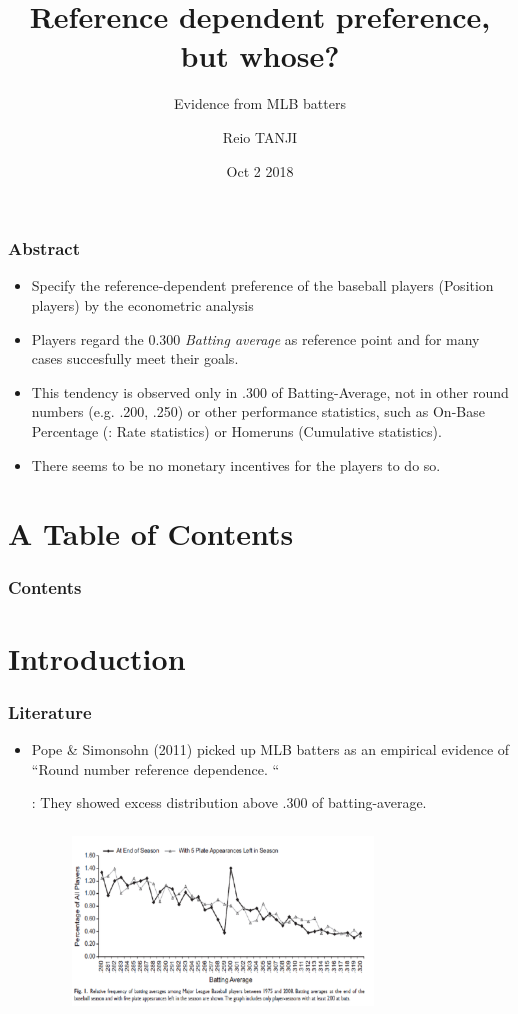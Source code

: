 \documentclass[dvipdfmx,12pt]{beamer}
\title{Reference dependent preference, but whose?}
\subtitle{Evidence from MLB batters}
\author{Reio TANJI}
\date{Oct 2 2018}
\institute{Osaka University}
\begin{document}
\begin{frame}\frametitle{}
\titlepage
\end{frame}

\begin{frame}\frametitle{Abstract}
  \begin{itemize}
    \item Specify the reference-dependent preference of the baseball
    players (Position players) by the econometric analysis

    \item Players regard the 0.300 \textit{Batting average}
    as reference point and for many cases succesfully meet their goals.

    \item This tendency is observed only in .300 of Batting-Average,
    not in other round numbers (e.g. .200, .250) or other
    performance statistics, such as On-Base Percentage (: Rate statistics)
     or Homeruns (Cumulative statistics).

    \item There seems to be no monetary incentives for the players to do so.
  \end{itemize}
\end{frame}

\section*{A Table of Contents}
\begin{frame}\frametitle{Contents}
 \tableofcontents
\end{frame}

\section{Introduction}
\begin{frame}\frametitle{Literature}
  \begin{itemize}
    \item Pope \& Simonsohn (2011) picked up MLB batters as an empirical evidence
    of ``Round number reference dependence. ``

    : They showed excess distribution above .300 of batting-average.

     \begin{figure}
       \includegraphics[width = 8cm, height = 5cm]{fig_tab/mt_fig1.pdf}
     \end{figure}
  \end{itemize}
\end{frame}
\end{document}
